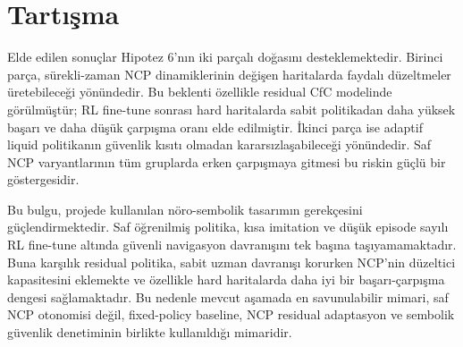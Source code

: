 \documentclass[11pt,a4paper]{article}
\begin{document}
\begin{table}[htbp]
\centering
\caption{Hard harita grubu ortalamaları.}
\label{tab:hard-summary}
\end{table}

\section{Tartışma}

Elde edilen sonuçlar Hipotez 6'nın iki parçalı doğasını desteklemektedir. Birinci parça, sürekli-zaman NCP dinamiklerinin değişen haritalarda faydalı düzeltmeler üretebileceği yönündedir. Bu beklenti özellikle residual CfC modelinde görülmüştür; RL fine-tune sonrası hard haritalarda sabit politikadan daha yüksek başarı ve daha düşük çarpışma oranı elde edilmiştir. İkinci parça ise adaptif liquid politikanın güvenlik kısıtı olmadan kararsızlaşabileceği yönündedir. Saf NCP varyantlarının tüm gruplarda erken çarpışmaya gitmesi bu riskin güçlü bir göstergesidir.

Bu bulgu, projede kullanılan nöro-sembolik tasarımın gerekçesini güçlendirmektedir. Saf öğrenilmiş politika, kısa imitation ve düşük episode sayılı RL fine-tune altında güvenli navigasyon davranışını tek başına taşıyamamaktadır. Buna karşılık residual politika, sabit uzman davranışı korurken NCP'nin düzeltici kapasitesini eklemekte ve özellikle hard haritalarda daha iyi bir başarı-çarpışma dengesi sağlamaktadır. Bu nedenle mevcut aşamada en savunulabilir mimari, saf NCP otonomisi değil, fixed-policy baseline, NCP residual adaptasyon ve sembolik güvenlik denetiminin birlikte kullanıldığı mimaridir.
\end{document}
